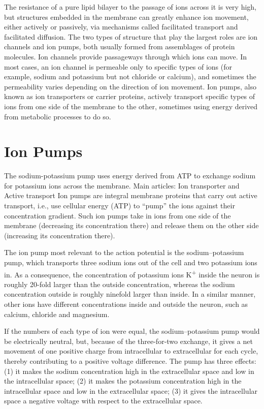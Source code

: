 The resistance of a pure lipid bilayer to the passage of ions across it is very high, but structures embedded in the membrane can greatly enhance ion movement, either actively or passively, via mechanisms called facilitated transport and facilitated diffusion. The two types of structure that play the largest roles are ion channels and ion pumps, both usually formed from assemblages of protein molecules. Ion channels provide passageways through which ions can move. In most cases, an ion channel is permeable only to specific types of ions (for example, sodium and potassium but not chloride or calcium), and sometimes the permeability varies depending on the direction of ion movement. Ion pumps, also known as ion transporters or carrier proteins, actively transport specific types of ions from one side of the membrane to the other, sometimes using energy derived from metabolic processes to do so.

\hypertarget{ion-pumps}{%
\section{Ion Pumps}\label{ion-pumps}}

The sodium-potassium pump uses energy derived from ATP to exchange sodium for potassium ions across the membrane.
Main articles: Ion transporter and Active transport
Ion pumps are integral membrane proteins that carry out active transport, i.e., use cellular energy (ATP) to ``pump'' the ions against their concentration gradient. Such ion pumps take in ions from one side of the membrane (decreasing its concentration there) and release them on the other side (increasing its concentration there).

The ion pump most relevant to the action potential is the sodium--potassium pump, which transports three sodium ions out of the cell and two potassium ions in. As a consequence, the concentration of potassium ions K\textsuperscript{+} inside the neuron is roughly 20-fold larger than the outside concentration, whereas the sodium concentration outside is roughly ninefold larger than inside. In a similar manner, other ions have different concentrations inside and outside the neuron, such as calcium, chloride and magnesium.

If the numbers of each type of ion were equal, the sodium--potassium pump would be electrically neutral, but, because of the three-for-two exchange, it gives a net movement of one positive charge from intracellular to extracellular for each cycle, thereby contributing to a positive voltage difference. The pump has three effects: (1) it makes the sodium concentration high in the extracellular space and low in the intracellular space; (2) it makes the potassium concentration high in the intracellular space and low in the extracellular space; (3) it gives the intracellular space a negative voltage with respect to the extracellular space.

